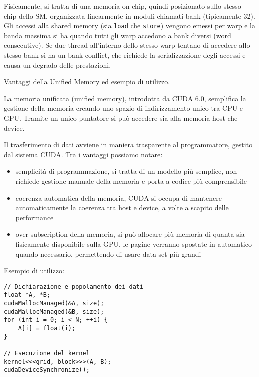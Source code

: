 \begin{questions}
\begin{solution}
        Fisicamente, si tratta di una memoria on-chip, quindi posizionato sullo stesso chip dello SM, organizzata linearmente in moduli chiamati bank (tipicamente 32). Gli accessi alla shared memory (sia \texttt{load} che \texttt{store}) vengono emessi per warp e la banda massima si ha quando tutti gli warp accedono a bank diversi (word consecutive). Se due thread all'interno dello stesso warp tentano di accedere allo stesso bank si ha un bank conflict, che richiede la serializzazione degli accessi e causa un degrado delle prestazioni.
    \end{solution}
    
    \question Vantaggi della Unified Memory ed esempio di utilizzo.
    
    \begin{solution}
        La memoria unificata (unified memory), introdotta da CUDA 6.0, semplifica la gestione della memoria creando uno spazio di indirizzamento unico tra CPU e GPU. Tramite un unico puntatore si può accedere sia alla memoria host che device. 
        
        Il trasferimento di dati avviene in maniera trasparente al programmatore, gestito dal sistema CUDA. Tra i vantaggi possiamo notare:
        \begin{itemize}
            \item semplicità di programmazione, si tratta di un modello più semplice, non richiede gestione manuale della memoria e porta a codice più comprensibile
            
            \item coerenza automatica della memoria, CUDA si occupa di mantenere automaticamente la coerenza tra host e device, a volte a scapito delle performance
            
            \item over-subscription della memoria, si può allocare più memoria di quanta sia fisicamente disponibile sulla GPU, le pagine verranno spostate in automatico quando necessario, permettendo di usare data set più grandi
        \end{itemize} 
        
        Esempio di utilizzo:
        \begin{verbatim}
// Dichiarazione e popolamento dei dati
float *A, *B;
cudaMallocManaged(&A, size);
cudaMallocManaged(&B, size);
for (int i = 0; i < N; ++i) {
    A[i] = float(i);
}

// Esecuzione del kernel
kernel<<<grid, block>>>(A, B);
cudaDeviceSynchronize();


\end{verbatim}
\end{solution}
\end{questions}
